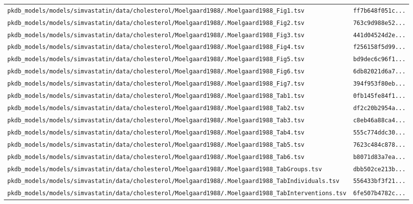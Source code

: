 \documentclass{article}
\begin{document}
\begin{longtable}{ll}
\texttt{pkdb\_models/models/simvastatin/data/cholesterol/Moelgaard1988/.Moelgaard1988\_Fig1.tsv} & \texttt{ff7b648f051c...} \\
\texttt{pkdb\_models/models/simvastatin/data/cholesterol/Moelgaard1988/.Moelgaard1988\_Fig2.tsv} & \texttt{763c9d988e52...} \\
\texttt{pkdb\_models/models/simvastatin/data/cholesterol/Moelgaard1988/.Moelgaard1988\_Fig3.tsv} & \texttt{441d04524d2e...} \\
\texttt{pkdb\_models/models/simvastatin/data/cholesterol/Moelgaard1988/.Moelgaard1988\_Fig4.tsv} & \texttt{f256158f5d99...} \\
\texttt{pkdb\_models/models/simvastatin/data/cholesterol/Moelgaard1988/.Moelgaard1988\_Fig5.tsv} & \texttt{bd9dec6c96f1...} \\
\texttt{pkdb\_models/models/simvastatin/data/cholesterol/Moelgaard1988/.Moelgaard1988\_Fig6.tsv} & \texttt{6db82021d6a7...} \\
\texttt{pkdb\_models/models/simvastatin/data/cholesterol/Moelgaard1988/.Moelgaard1988\_Fig7.tsv} & \texttt{394f953f80eb...} \\
\texttt{pkdb\_models/models/simvastatin/data/cholesterol/Moelgaard1988/.Moelgaard1988\_Tab1.tsv} & \texttt{0fb145fe84f1...} \\
\texttt{pkdb\_models/models/simvastatin/data/cholesterol/Moelgaard1988/.Moelgaard1988\_Tab2.tsv} & \texttt{df2c20b2954a...} \\
\texttt{pkdb\_models/models/simvastatin/data/cholesterol/Moelgaard1988/.Moelgaard1988\_Tab3.tsv} & \texttt{c8eb46a88ca4...} \\
\texttt{pkdb\_models/models/simvastatin/data/cholesterol/Moelgaard1988/.Moelgaard1988\_Tab4.tsv} & \texttt{555c774ddc30...} \\
\texttt{pkdb\_models/models/simvastatin/data/cholesterol/Moelgaard1988/.Moelgaard1988\_Tab5.tsv} & \texttt{7623c484c878...} \\
\texttt{pkdb\_models/models/simvastatin/data/cholesterol/Moelgaard1988/.Moelgaard1988\_Tab6.tsv} & \texttt{b8071d83a7ea...} \\
\texttt{pkdb\_models/models/simvastatin/data/cholesterol/Moelgaard1988/.Moelgaard1988\_TabGroups.tsv} & \texttt{dbb502ce213b...} \\
\texttt{pkdb\_models/models/simvastatin/data/cholesterol/Moelgaard1988/.Moelgaard1988\_TabIndividuals.tsv} & \texttt{556433bf3f21...} \\
\texttt{pkdb\_models/models/simvastatin/data/cholesterol/Moelgaard1988/.Moelgaard1988\_TabInterventions.tsv} & \texttt{6fe507b4782c...} \\

\end{longtable}
\end{document}
